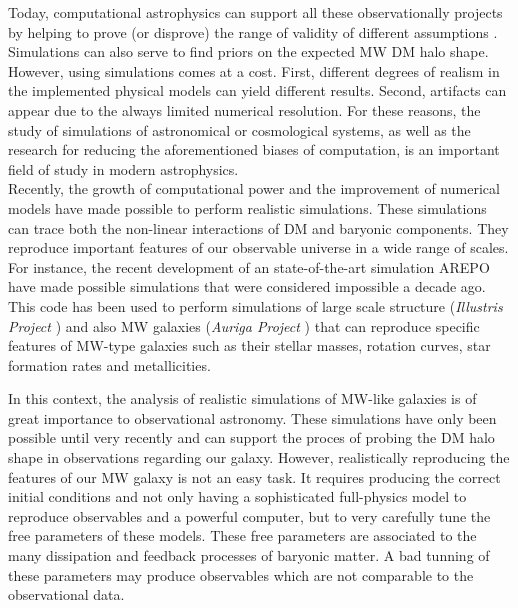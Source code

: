 \documentclass[12pt]{article}
\begin{document}
Today, computational astrophysics can support all these observationally projects by helping to prove (or disprove) the range of validity of different assumptions \cite{prove,bardeen,Vera-Ciro2011}.
Simulations can also serve to find priors on the expected MW DM halo shape.
However, using simulations comes at a cost.
First, different degrees of realism in the implemented physical models can yield different results.
Second, artifacts can appear due to the always limited numerical resolution. 
For these reasons, the study of simulations of astronomical or cosmological systems, as well as the research for reducing the aforementioned biases of computation, is an important field of study in modern astrophysics.\\

Recently, the growth of computational power and the improvement of numerical models have made possible to perform realistic simulations.
These simulations can trace both the non-linear interactions of DM and baryonic components. 
They reproduce important features of our observable universe in a wide range of scales.
For instance, the recent development of an state-of-the-art simulation AREPO \cite{arepo} have made possible simulations that were considered impossible a decade ago.
This code has been used to perform simulations of large scale structure (\emph{Illustris Project} \cite{Illustris2}) and also 
MW galaxies (\emph{Auriga Project} \cite{auriga}) that can reproduce specific features of MW-type galaxies such as their stellar masses, rotation curves, star formation rates and metallicities.

In this context, the analysis of realistic simulations of MW-like galaxies is of great importance to observational astronomy. 
These simulations have only been possible until very recently \cite{aquarius} and can support the proces of probing the DM halo shape in observations regarding our galaxy.
However, realistically reproducing the features of our MW galaxy is not an easy task. 
It requires producing the correct initial conditions and not only having a sophisticated full-physics model to reproduce observables and a powerful computer, but to very carefully tune the free parameters of these models. 
These free parameters are associated to the many dissipation and feedback processes of baryonic matter.
A bad tunning of these parameters may produce observables which are not comparable to the observational data.\\
\end{document}
